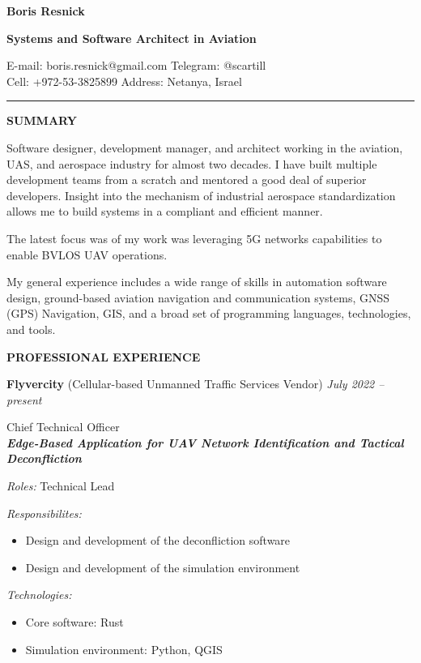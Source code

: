 \documentclass[a4paper]{article}
\newcommand{\project}[4]{

	\textbf{\textit{#1}}
    \vspace{2mm}

    \textit{Roles:} #2
    \vspace{2mm}

    \textit{Responsibilites:}
	\begin{itemize}
	    \setlength{\itemindent}{.5cm}
	    #3
    \end{itemize}
    
	\textit{Technologies:}
	\begin{itemize}
		\setlength{\itemindent}{.5cm}
		#4
	\end{itemize}
}
\begin{document}
    \thispagestyle{empty}
    
	\begin{center}
		{\Large \textbf{Boris Resnick}\par}
		\vspace{2mm}
		{\large \textbf{Systems and Software Architect in A\hspace{-.4mm}viation}\par}
		\vspace{1.5mm}
		E-mail: boris.resnick@gmail.com \vspace{1.5mm} \quad \quad
		Telegram: @scartill \\
		Cell: +972-53-3825899 \quad \quad
		Address: Netanya, Israel
	\end{center}
	\vspace{-2mm}
	\rule{\textwidth}{1pt}
	\vspace{2mm}

	\textbf{SUMMARY}
	\vspace{5mm}

	Software designer, development manager, and architect working in the aviation, UAS, and aerospace industry for almost two decades. I have built multiple development teams from a scratch and mentored a good deal of superior developers. Insight into the mechanism of industrial aerospace standardization allows me to build systems in a compliant and efficient manner.

	The latest focus was of my work was leveraging 5G networks capabilities to enable BVLOS UAV operations.

	My general experience includes a wide range of skills in automation software design, ground-based aviation navigation and communication systems, GNSS (GPS) Navigation, GIS, and a broad set of programming languages, technologies, and tools.

    \vspace{5mm}
	\textbf{PROFESSIONAL EXPERIENCE}
	\vspace{5mm}

	\textbf{Flyvercity} (Cellular-based Unmanned Traffic Services Vendor) \hfill \textit{July 2022 -- present}

    \vspace{2mm}
	Chief Technical Officer\\

	\project{Edge-Based Application for UAV Network Identification and Tactical Deconfliction}{
		Technical Lead
	}{
		\item Design and development of the deconfliction software
		\item Design and development of the simulation environment
	}{
		\item Core software: Rust
		\item Simulation environment: Python, QGIS
	}
\end{document}
